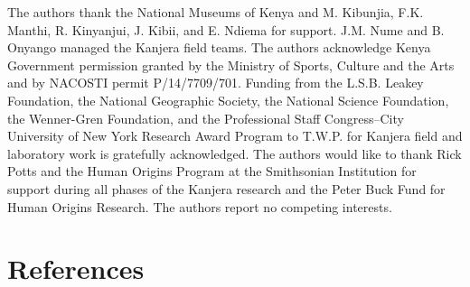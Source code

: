 \documentclass[]{elsarticle} %
\begin{document}
The authors thank the National Museums of Kenya and M. Kibunjia, F.K.
Manthi, R. Kinyanjui, J. Kibii, and E. Ndiema for support. J.M. Nume and
B. Onyango managed the Kanjera field teams. The authors acknowledge
Kenya Government permission granted by the Ministry of Sports, Culture
and the Arts and by NACOSTI permit P/14/7709/701. Funding from the
L.S.B. Leakey Foundation, the National Geographic Society, the National
Science Foundation, the Wenner-Gren Foundation, and the Professional
Staff Congress--City University of New York Research Award Program to
T.W.P. for Kanjera field and laboratory work is gratefully acknowledged.
The authors would like to thank Rick Potts and the Human Origins Program
at the Smithsonian Institution for support during all phases of the
Kanjera research and the Peter Buck Fund for Human Origins Research. The
authors report no competing interests.

\hypertarget{references}{%
\section*{References}\label{references}}
\end{document}
